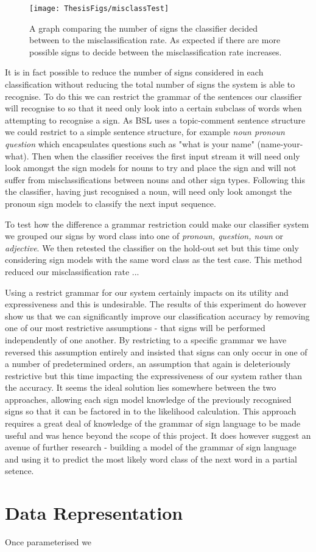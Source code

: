 \begin{figure}[h!]
        \centering
        \texttt{[image: ThesisFigs/misclassTest]}
        \caption{A graph comparing the number of signs the classifier decided between to the misclassification rate. As expected if there are more possible signs to decide between the misclassification rate increases.}\label{fig:misclassTest}
\end{figure}

It is in fact possible to reduce the number of signs considered in each classification without reducing the total number of signs the system is able to recognise. To do this we can restrict the grammar of the sentences our classifier will recognise to so that it need only look into a certain subclass of words when attempting to recognise a sign. As BSL uses a topic-comment sentence structure we could restrict to a simple sentence structure, for example \emph{noun pronoun question} which encapsulates questions such as "what is your name" (name-your-what). Then when the classifier receives the first input stream it will need only look amongst the sign models for nouns to try and place the sign and will not suffer from misclassifications between nouns and other sign types. Following this the classifier, having just recognised a noun, will need only look amongst the pronoun sign models to classify the next input sequence. 

To test how the difference a grammar restriction could make our classifier system we grouped our signs by word class into one of \emph{pronoun, question, noun} or \emph{adjective}. We then retested the classifier on the hold-out set but this time only considering sign models with the same word class as the test case. This method reduced our misclassification rate ...

Using a restrict grammar for our system certainly impacts on its utility and expressiveness and this is undesirable. The results of this experiment do however show us that we can significantly improve our classification accuracy by removing one of our most restrictive assumptions - that signs will be performed independently of one another. By restricting to a specific grammar we have reversed this assumption entirely and insisted that signs can only occur in one of a number of predetermined orders, an assumption that again is deleteriously restrictive but this time impacting the expressiveness of our system rather than the accuracy. It seems the ideal solution lies somewhere between the two approaches, allowing each sign model knowledge of the previously recognised signs so that it can be factored in to the likelihood calculation. This approach requires a great deal of knowledge of the grammar of sign language to be made useful and was hence beyond the scope of this project. It does however suggest an avenue of further research - building a model of the grammar of sign language and using it to predict the most likely word class of the next word in a partial setence.


\section{Data Representation}
Once parameterised we 


